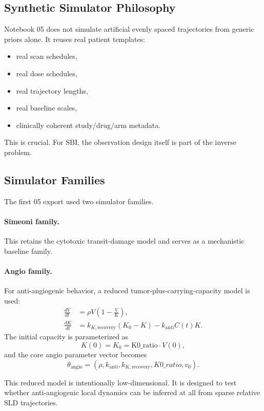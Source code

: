 \documentclass[11pt,a4paper]{article}
\newcommand{\sld}{\ensuremath{\mathrm{SLD}}}
\begin{document}
\subsection{Synthetic Simulator Philosophy}

Notebook 05 does not simulate artificial evenly spaced trajectories from generic priors alone. It reuses real patient templates:
\begin{itemize}[leftmargin=2em]
    \item real scan schedules,
    \item real dose schedules,
    \item real trajectory lengths,
    \item real baseline scales,
    \item clinically coherent study/drug/arm metadata.
\end{itemize}

This is crucial. For SBI, the observation design itself is part of the inverse problem.

\subsection{Simulator Families}

The first 05 export used two simulator families.

\paragraph{Simeoni family.}
This retains the cytotoxic transit-damage model and serves as a mechanistic baseline family.

\paragraph{Angio family.}
For anti-angiogenic behavior, a reduced tumor-plus-carrying-capacity model is used:
\[
\begin{aligned}
    \frac{dV}{dt}
    &=\rho V\left(1-\frac{V}{K}\right),\\
    \frac{dK}{dt}
    &=k_{K,\mathrm{recovery}}(K_0-K)-k_{\mathrm{anti}}C(t)K.
\end{aligned}
\]
The initial capacity is parameterized as
\[
    K(0)=K_0=\text{K0\_ratio}\cdot V(0),
\]
and the core angio parameter vector becomes
\[
    \theta_{\mathrm{angio}}
    =
    (\rho,k_{\mathrm{anti}},k_{K,\mathrm{recovery}},K0\_ratio,v_0).
\]

This reduced model is intentionally low-dimensional. It is designed to test whether anti-angiogenic local dynamics can be inferred at all from sparse relative \sld{} trajectories.
\end{document}
